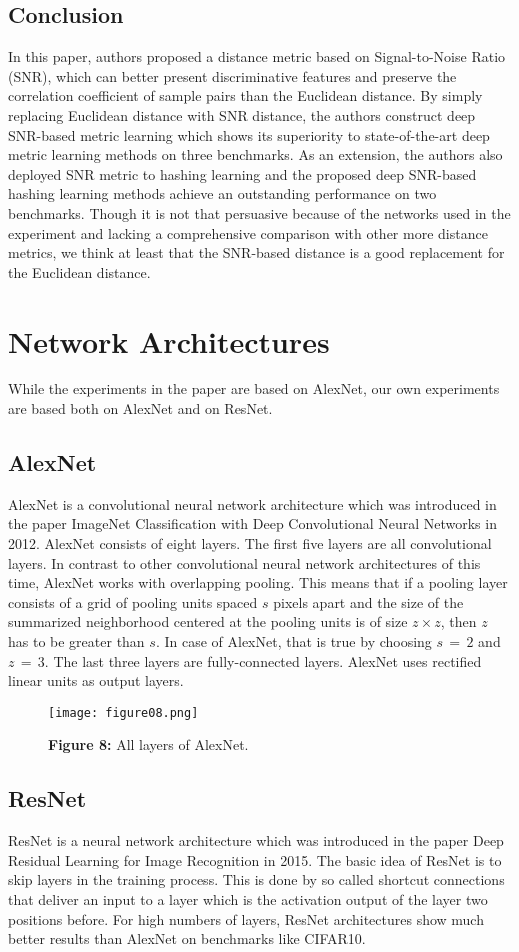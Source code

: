 \documentclass[12pt,paper=a4]{scrartcl}
\theoremstyle{break}
\begin{document}
\subsection{Conclusion}
In this paper, authors proposed a distance metric based on Signal-to-Noise Ratio (SNR), which can better present discriminative features and preserve the correlation coefficient of sample pairs than the Euclidean distance. By simply replacing Euclidean distance with SNR distance, the authors construct deep SNR-based metric learning which shows its superiority to state-of-the-art deep metric learning methods on three benchmarks. As an extension, the authors also deployed SNR metric to hashing learning and the proposed deep SNR-based hashing learning methods achieve an outstanding performance on two benchmarks. Though it is not that persuasive because of the networks used in the experiment and lacking a comprehensive comparison with other more distance metrics, we think at least that the SNR-based distance is a good replacement for the Euclidean distance.\cite{source1}
\section{Network Architectures}
While the experiments in the paper are based on AlexNet, our own experiments are based both on AlexNet and on ResNet.
\subsection{AlexNet}
AlexNet is a convolutional neural network architecture which was introduced in the paper \dq ImageNet Classification with Deep Convolutional Neural Networks\dq\cite{alex} in 2012. AlexNet consists of eight layers. The first five layers are all convolutional layers. In contrast to other convolutional neural network architectures of this time, AlexNet works with overlapping pooling. This means that if a pooling layer consists of a grid of pooling units spaced $s$ pixels apart and the size of the summarized neighborhood centered at the pooling units is of size $z\times z$, then $z$ has to be greater than $s$. In case of AlexNet, that is true by choosing $s\,=\, 2$ and $z\,=\, 3$. The last three layers are fully-connected layers. AlexNet uses rectified linear units as output layers.\cite{alex}
\begin{figure}[h]
	\centering
  \texttt{[image: figure08.png]}
  \caption{\textbf{Figure 8:} All layers of AlexNet.\cite{alex}}
\end{figure}
\subsection{ResNet}
ResNet is a neural network architecture which was introduced in the paper \dq Deep Residual Learning for Image Recognition\dq\cite{resnet} in 2015. The basic idea of ResNet is to skip layers in the training process. This is done by so called shortcut connections that deliver an input to a layer which is the activation output of the layer two positions before. For high numbers of layers, ResNet architectures show much better results than AlexNet on benchmarks like CIFAR10.\cite{resnet}
\end{document}

